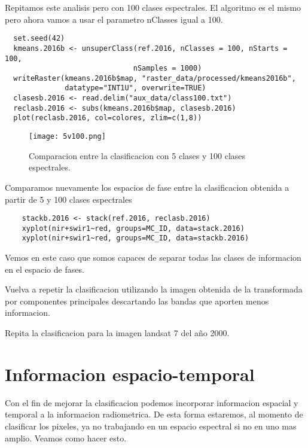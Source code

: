 \begin{exa}
  Repitamos este analisis pero con 100 clases espectrales. El algoritmo es el mismo
  pero ahora vamos a usar el parametro nClasses igual a 100.
  \begin{lstlisting}
  set.seed(42)
  kmeans.2016b <- unsuperClass(ref.2016, nClasses = 100, nStarts = 100,
                              nSamples = 1000)
  writeRaster(kmeans.2016b$map, "raster_data/processed/kmeans2016b",
              datatype="INT1U", overwrite=TRUE)
  clasesb.2016 <- read.delim("aux_data/class100.txt")
  reclasb.2016 <- subs(kmeans.2016b$map, clasesb.2016)
  plot(reclasb.2016, col=colores, zlim=c(1,8))
  \end{lstlisting}

  \begin{figure}[h!]
    \centering
    \texttt{[image: 5v100.png]}
    \caption{Comparacion entre la clasificacion con 5 clases y 100 clases espectrales.}
    \label{fig:5v100}
  \end{figure}

  Comparamos nuevamente los espacios de fase entre la clasificacion obtenida a partir de 5 y 100 clases espectrales
  \begin{lstlisting}
    stackb.2016 <- stack(ref.2016, reclasb.2016)
    xyplot(nir+swir1~red, groups=MC_ID, data=stack.2016)
    xyplot(nir+swir1~red, groups=MC_ID, data=stackb.2016)
  \end{lstlisting}

  Vemos en este caso que somos capaces de separar todas las clases de informacion en el espacio de fases.

\end{exa}

\begin{act}
    Vuelva a repetir la clasificacion utilizando la imagen obtenida de la transformada por componentes principales descartando las bandas que aporten menos informacion.
\end{act}

\begin{act}
  Repita la clasificacion para la imagen landsat 7 del año 2000.
\end{act}


\section{Informacion espacio-temporal}
Con el fin de mejorar la clasificacion podemos incorporar informacion espacial y temporal a la informacion radiometrica. De esta forma estaremos, al momento de clasificar los pixeles, ya no trabajando en un espacio espectral si no en uno mas amplio. Veamos como hacer esto.

